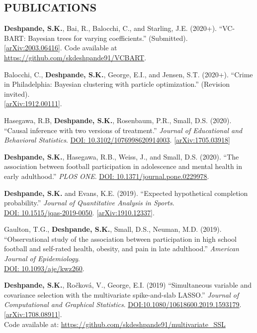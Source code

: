 \documentclass[margin]{res}
\begin{document}
\begin{resume}
\section{PUBLICATIONS}

\textbf{Deshpande, S.K.}, Bai, R., Balocchi, C., and Starling, J.E. (2020+). ``VC-BART: Bayesian trees for varying coefficients.'' (Submitted). \\\href{https://arxiv.org/abs/2003.06416}{[arXiv:2003.06416]}. Code available at \url{https://github.com/skdeshpande91/VCBART}.

Balocchi, C., \textbf{Deshpande, S.K.}, George, E.I., and Jensen, S.T. (2020+). ``Crime in Philadelphia: Bayesian clustering with particle optimization.'' (Revision invited). \\ \href{https://arxiv.org/abs/1912.00111}{[arXiv:1912.00111]}.

Hasegawa, R.B, \textbf{Deshpande, S.K.}, Rosenbaum, P.R., Small, D.S. (2020). ``Causal inference with two versions of treatment.'' \textit{Journal of Educational and Behavioral Statistics}. \href{https://doi.org/10.3102/1076998620914003}{DOI: 10.3102/1076998620914003}. \href{https://arxiv.org/abs/1705.03918}{[arXiv:1705.03918]}

\textbf{Deshpande, S.K.}, Hasegawa, R.B., Weiss, J., and Small, D.S. (2020). ``The association between football participation in adolescence and mental health in early adulthood.'' \textit{PLOS ONE}.  \href{https://doi.org/10.1371/journal.pone.0229978}{DOI: 10.1371/journal.pone.0229978}.

\textbf{Deshpande, S.K.} and Evans, K.E. (2019). ``Expected hypothetical completion probability.'' \textit{Journal of Quantitative Analysis in Sports}. \\\href{https://doi.org/10.1515/jqas-2019-0050}{DOI: 10.1515/jqas-2019-0050}. \href{https://arxiv.org/abs/1910.12337}{[arXiv:1910.12337]}.

Gaulton, T.G., \textbf{Deshpande, S.K.}, Small, D.S., Neuman, M.D. (2019). ``Observational study of the association between participation in high school football and self-rated health, obesity, and pain in late adulthood.'' \textit{American Journal of Epidemiology}. \\ \href{https://doi.org/10.1093/aje/kwz260}{DOI: 10.1093/aje/kwz260}.

\textbf{Deshpande, S.K.}, Ro\v{c}kov\'{a}, V.,  George, E.I. (2019) ``Simultaneous variable and covariance selection with the multivariate spike-and-slab LASSO.'' \textit{Journal of Computational and Graphical Statistics}. \href{https://doi.org/10.1080/10618600.2019.1593179}{DOI:10.1080/10618600.2019.1593179}. \href{https://arxiv.org/abs/1708.08911}{[arXiv:1708.08911]}. \\ Code available at: \url{https://github.com/skdeshpande91/multivariate_SSL}


\end{resume}
\end{document}
